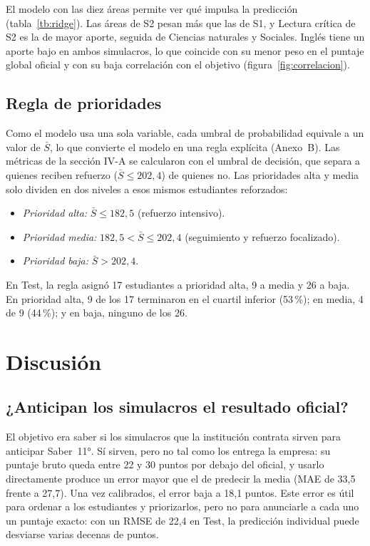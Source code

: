 \documentclass[10pt,letterpaper,twocolumn]{article}
\newcommand{\parencite}{\citep}
\begin{document}
El modelo con las diez áreas permite ver qué impulsa la predicción (tabla~\ref{tb:ridge}). Las áreas de S2 pesan más que las de S1, y Lectura crítica de S2 es la de mayor aporte, seguida de Ciencias naturales y Sociales. Inglés tiene un aporte bajo en ambos simulacros, lo que coincide con su menor peso en el puntaje global oficial \parencite{icfes2026saber11} y con su baja correlación con el objetivo (figura~\ref{fig:correlacion}).

\subsection{Regla de prioridades}

Como el modelo usa una sola variable, cada umbral de probabilidad equivale a un valor de $\bar{S}$, lo que convierte el modelo en una regla explícita (Anexo~B). Las métricas de la sección IV-A se calcularon con el umbral de decisión, que separa a quienes reciben refuerzo ($\bar{S} \leq 202{,}4$) de quienes no. Las prioridades alta y media solo dividen en dos niveles a esos mismos estudiantes reforzados:

\begin{itemize}
    \item \textit{Prioridad alta:} $\bar{S} \leq 182{,}5$ (refuerzo intensivo).
    \item \textit{Prioridad media:} $182{,}5 < \bar{S} \leq 202{,}4$ (seguimiento y refuerzo focalizado).
    \item \textit{Prioridad baja:} $\bar{S} > 202{,}4$.
\end{itemize}

En Test, la regla asignó 17 estudiantes a prioridad alta, 9 a media y 26 a baja. En prioridad alta, 9 de los 17 terminaron en el cuartil inferior (53\,\%); en media, 4 de 9 (44\,\%); y en baja, ninguno de los 26.

\section{Discusión}

\subsection{¿Anticipan los simulacros el resultado oficial?}

El objetivo era saber si los simulacros que la institución contrata sirven para anticipar Saber~11°. Sí sirven, pero no tal como los entrega la empresa: su puntaje bruto queda entre 22 y 30 puntos por debajo del oficial, y usarlo directamente produce un error mayor que el de predecir la media (MAE de 33,5 frente a 27,7). Una vez calibrados, el error baja a 18,1 puntos. Este error es útil para ordenar a los estudiantes y priorizarlos, pero no para anunciarle a cada uno un puntaje exacto: con un RMSE de 22,4 en Test, la predicción individual puede desviarse varias decenas de puntos.
\end{document}

